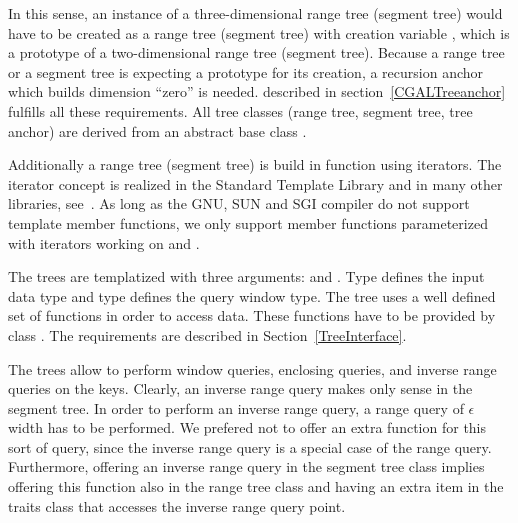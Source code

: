 In this sense, an instance of a
three-dimensional range tree (segment tree) would have to be
created as a range tree (segment tree) with creation variable
 , which is a prototype of a two-dimensional
range tree (segment tree). Because a range tree or a segment tree
is expecting a prototype for its creation, a recursion anchor which
builds dimension ``zero'' is needed.
 described in
section~\ref{CGALTreeanchor} fulfills all these requirements.
All tree classes (range tree, segment tree, tree anchor) are
derived from an abstract base class
.

Additionally a range tree (segment tree) is build in function
 using  iterators.
The iterator concept is realized in the Standard
Template Library and in many other libraries,
see~\cite{ms-strg-96}. As long as the GNU, SUN and SGI compiler do not
support template member functions, we only support member
functions parameterized with iterators working on  and .

The trees are templatized with three arguments:  and . Type  defines
the input data type and type  defines the query
window type.
The tree uses a well defined set of functions in
order to access data. These functions have to be provided by
class . The requirements are described in
Section~\ref{TreeInterface}.

The trees allow to perform
window queries, enclosing queries, and inverse range queries on
the keys. Clearly, an inverse range query makes only sense in the
segment tree.
In order to perform an inverse range query, a range query of
$\epsilon$ width has to be performed. We prefered not to offer an
extra function for this sort of query, since the inverse range
query is a special case of the range query. Furthermore, offering
an inverse range query in the segment tree class implies offering this
function also in the range tree class and having an extra item in
the traits class that accesses the inverse range query point.


